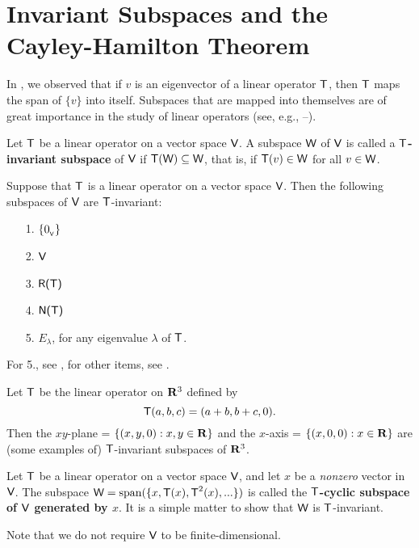 \section{Invariant Subspaces and the Cayley-Hamilton Theorem} \label{sec 5.4}

In , we observed that if \(v\) is an eigenvector of a linear operator \(\textsf{T}\), then \(\textsf{T}\) maps the span of \(\{ v \}\) into itself.
Subspaces that are mapped into themselves are of great importance in the study of linear operators (see, e.g., --).

\begin{definition} \label{def 5.14}
Let \(\textsf{T}\) be a linear operator on a vector space \(\textsf{V}\).
A subspace \(\textsf{W}\) of \(\textsf{V}\) is called a \textbf{\(\textsf{T}\)-invariant subspace} of \(\textsf{V}\) if \(\textsf{T}(\textsf{W}) \subseteq \textsf{W}\), that is, if
\(\textsf{T}(v) \in \textsf{W}\) for all \(v \in \textsf{W}\).
\end{definition}

\begin{example} \label{example 5.4.1}
Suppose that \(\textsf{T}\) is a linear operator on a vector space \(\textsf{V}\).
Then the following subspaces of \(\textsf{V}\) are \(\textsf{T}\)-invariant:
\begin{enumerate}
\item[1.] \(\{ 0_{_{\textsf{V}}} \}\)
\item[2.] \(\textsf{V}\)
\item[3.] \(\textsf{R(T)}\)
\item[4.] \(\textsf{N(T)}\)
\item[5.] \(E_{\lambda}\), for any eigenvalue \(\lambda\) of \(\textsf{T}\).
\end{enumerate}

For 5., see , for other items, see .
\end{example}

\begin{example} \label{example 5.4.2}
Let \(\textsf{T}\) be the linear operator on \(\mathbf{R}^3\) defined by
\[
    \textsf{T}(a, b, c) = (a + b, b + c, 0).
\]
Then the \(xy\)-plane = \(\{ (x, y, 0): x, y \in \mathbf{R} \}\) and the \(x\)-axis = \(\{ (x, 0, 0): x \in \mathbf{R}\}\) are (some examples of) \(\textsf{T}\)-invariant subspaces of \(\mathbf{R}^3\).
\end{example}

\begin{additional definition} \label{adef 5.5}
Let \(\textsf{T}\) be a linear operator on a vector space \(\textsf{V}\), and let \(x\) be a \emph{nonzero} vector in \(\textsf{V}\).
The subspace \(\textsf{W} = \operatorname{span}(\{ x, \textsf{T}(x), \textsf{T}^2(x), ... \})\) is called the \textbf{\(\textsf{T}\)-cyclic subspace of \(\textsf{V}\) generated by \(x\)}.
It is a simple matter to show that \(\textsf{W}\) is \(\textsf{T}\)-invariant.

Note that we do not require \(\textsf{V}\) to be finite-dimensional.
\end{additional definition}

